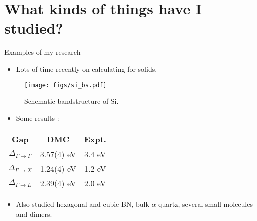 \documentclass[12pt, pdf, hyperref={draft}, usenames, dvipsnames]{beamer}
\newcommand{\blue}[1]{{\bf\color{NavyBlue}{#1}}}
\begin{document}
\section{What kinds of things have I studied?}
\begin{frame}{Examples of my research}
  \begin{itemize}
    \item Lots of time recently on calculating \blue{band gaps} for solids.
  \end{itemize}
\begin{minipage}{0.60\textwidth}
  \begin{figure}[H]
    \centering
    \texttt{[image: figs/si\_bs.pdf]}
    \caption{Schematic bandstructure of Si.}
    \label{fig:quartz}
  \end{figure}
\end{minipage}%
\hfill
\begin{minipage}{0.4\textwidth}
  \begin{itemize}
    \item Some results :
  \vspace{0.2cm}
  \end{itemize}
\centering
\begin{tabular}{ccc}  \hline
Gap & DMC & Expt.\footnotemark \\ \hline
$\Delta_{\Gamma \rightarrow \Gamma}$ & 3.57(4) eV & 3.4 eV \\
$\Delta_{\Gamma \rightarrow X}$      & 1.24(4) eV & 1.2 eV \\
$\Delta_{\Gamma \rightarrow L}$      & 2.39(4) eV & 2.0 eV
\end{tabular}

\end{minipage}
\vspace{0.1cm}
  \begin{itemize}
    \item Also studied hexagonal and cubic BN, bulk $\alpha$-quartz, several
    small molecules and dimers.
  \end{itemize}


\end{frame}
\end{document}

